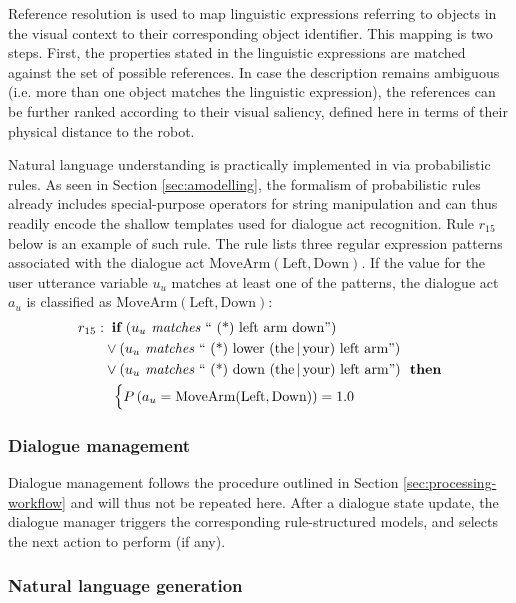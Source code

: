 Reference resolution is used to map linguistic expressions referring to objects in the visual context to their corresponding object identifier.  This mapping is two steps.  First, the properties stated in the linguistic expressions are matched against the set of possible references.  In case the description remains ambiguous (i.e. more than one object matches the linguistic expression), the references can be further ranked according to their visual saliency, defined here in terms of their physical distance to the robot. 

Natural language understanding is practically implemented in \opendial via probabilistic rules.  As seen in Section \ref{sec:amodelling}, the formalism of probabilistic rules already includes special-purpose operators for string manipulation and can thus readily encode the shallow templates used for dialogue act recognition.  Rule $r_{15}$ below is an example of such rule.  The rule lists three regular expression patterns associated with the dialogue act $\mathrm{MoveArm(Left,Down)}$.  If the value for the user utterance variable $u_u$ matches at least one of the patterns, the dialogue act $a_u$ is classified as $\mathrm{MoveArm(Left,Down)}$:
\begin{align*}
r_{15}: &\;\;\textbf{if} \ (u_u \textit{ matches } \text{`` (*) left arm down''} ) \\ 
& \lor (u_u \textit{ matches } \text{`` (*) lower (the\,|\,your) left arm''} ) \\
& \lor (u_u \textit{ matches } \text{`` (*) down (the\,|\,your) left arm''}   )  \ \ \textbf{then} \\ 
& \; \; \begin{cases} P\left(a_u = \mathrm{MoveArm(Left,Down)}\right) = 1.0 \end{cases}
\end{align*}

\subsubsection*{Dialogue management}

Dialogue management follows the procedure outlined in Section \ref{sec:processing-workflow} and will thus not be repeated here. After a dialogue state update, the dialogue manager triggers the corresponding rule-structured models, and selects the next action to perform (if any). 

\subsubsection*{Natural language generation}

